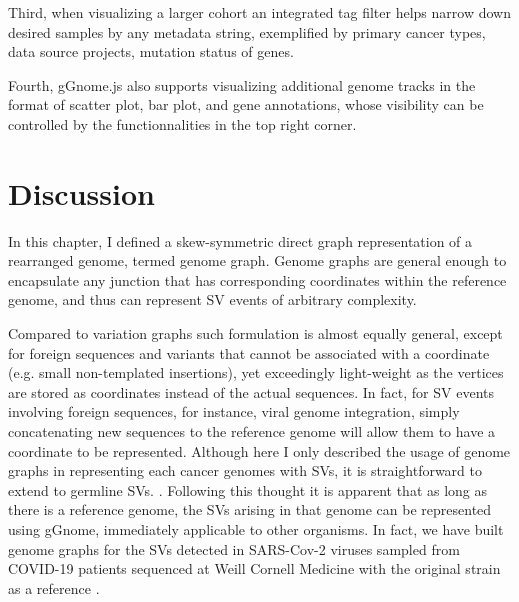 \documentclass[phd,tocprelim]{cornell}
\begin{document}

Third, when visualizing a larger cohort an integrated tag filter helps narrow down desired samples by any metadata string, exemplified by primary cancer types, data source projects, mutation status of genes.

Fourth, gGnome.js also supports visualizing additional genome tracks in the format of scatter plot, bar plot, and gene annotations, whose visibility can be controlled by the functionnalities in the top right corner.


\section{Discussion}
In this chapter, I defined a skew-symmetric direct graph representation of a rearranged genome, termed genome graph. Genome graphs are general enough to encapsulate any junction that has corresponding coordinates within the reference genome, and thus can represent SV events of arbitrary complexity. 

Compared to variation graphs \cite{Hickey2020-cu} such formulation is almost equally general, except for foreign sequences and variants that cannot be associated with a coordinate (e.g. small non-templated insertions), yet exceedingly light-weight as the vertices are stored as coordinates instead of the actual sequences. In fact, for SV events involving foreign sequences, for instance, viral genome integration, simply concatenating new sequences to the reference genome will allow them to have a coordinate to be represented. Although here I only described the usage of genome graphs in representing each cancer genomes with SVs, it is straightforward to extend to germline SVs. \cite{Siren2020-tf,Eizenga2020-cf}. Following this thought it is apparent that as long as there is a reference genome, the SVs arising in that genome can be represented using gGnome, immediately applicable to other organisms. In fact, we have built genome graphs for the SVs detected in SARS-Cov-2 viruses sampled from COVID-19 patients sequenced at Weill Cornell Medicine with the original strain as a reference \cite{Butler2021-mp}.
\end{document}
